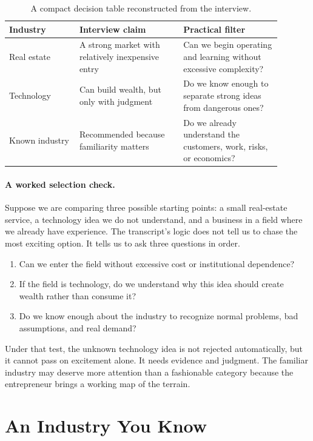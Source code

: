 \begin{table}
\centering
\begin{tabular}{p{0.23\linewidth} p{0.34\linewidth} p{0.32\linewidth}}
\hline
Industry & Interview claim & Practical filter \\
\hline
Real estate & A strong market with relatively inexpensive entry & Can we begin operating and learning without excessive complexity? \\
Technology & Can build wealth, but only with judgment & Do we know enough to separate strong ideas from dangerous ones? \\
Known industry & Recommended because familiarity matters & Do we already understand the customers, work, risks, or economics? \\
\hline
\end{tabular}
\caption{A compact decision table reconstructed from the interview.}
\end{table}

\paragraph{A worked selection check.}
Suppose we are comparing three possible starting points: a small real-estate service, a technology idea we do not understand, and a business in a field where we already have experience. The transcript's logic does not tell us to chase the most exciting option. It tells us to ask three questions in order.

\begin{enumerate}
\item Can we enter the field without excessive cost or institutional dependence?
\item If the field is technology, do we understand why this idea should create wealth rather than consume it?
\item Do we know enough about the industry to recognize normal problems, bad assumptions, and real demand?
\end{enumerate}

Under that test, the unknown technology idea is not rejected automatically, but it cannot pass on excitement alone. It needs evidence and judgment. The familiar industry may deserve more attention than a fashionable category because the entrepreneur brings a working map of the terrain.

\section{An Industry You Know}


